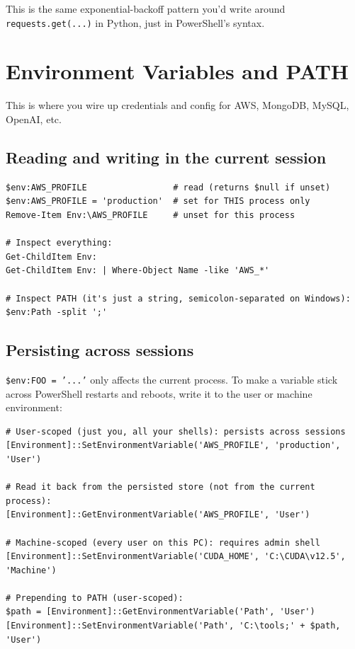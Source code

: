 \documentclass[11pt,a4paper]{article}
\begin{document}
This is the same exponential-backoff pattern you'd write around
\texttt{requests.get(...)} in Python, just in PowerShell's syntax.

\section{Environment Variables and PATH}
\label{sec:env}

This is where you wire up credentials and config for AWS, MongoDB,
MySQL, OpenAI, etc.

\subsection*{Reading and writing in the current session}

\begin{lstlisting}[style=pwshstyle]
$env:AWS_PROFILE                 # read (returns $null if unset)
$env:AWS_PROFILE = 'production'  # set for THIS process only
Remove-Item Env:\AWS_PROFILE     # unset for this process

# Inspect everything:
Get-ChildItem Env:
Get-ChildItem Env: | Where-Object Name -like 'AWS_*'

# Inspect PATH (it's just a string, semicolon-separated on Windows):
$env:Path -split ';'
\end{lstlisting}

\subsection*{Persisting across sessions}

\texttt{\$env:FOO = '...'} only affects the current process. To make a
variable stick across PowerShell restarts and reboots, write it to
the user or machine environment:

\begin{lstlisting}[style=pwshstyle]
# User-scoped (just you, all your shells): persists across sessions
[Environment]::SetEnvironmentVariable('AWS_PROFILE', 'production', 'User')

# Read it back from the persisted store (not from the current process):
[Environment]::GetEnvironmentVariable('AWS_PROFILE', 'User')

# Machine-scoped (every user on this PC): requires admin shell
[Environment]::SetEnvironmentVariable('CUDA_HOME', 'C:\CUDA\v12.5', 'Machine')

# Prepending to PATH (user-scoped):
$path = [Environment]::GetEnvironmentVariable('Path', 'User')
[Environment]::SetEnvironmentVariable('Path', 'C:\tools;' + $path, 'User')
\end{lstlisting}
\end{document}
